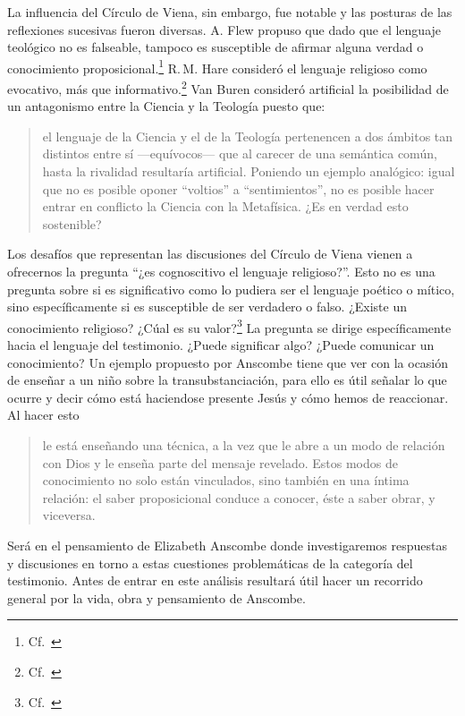 La influencia del Círculo de Viena, sin embargo, fue notable y las posturas de las reflexiones sucesivas fueron diversas. A. Flew propuso que dado que el lenguaje teológico no es falseable, tampoco es susceptible de afirmar alguna verdad o conocimiento proposicional.\footnote{Cf.~\cite[27--30]{conesa1994cc}} R.\,M. Hare consideró el lenguaje religioso como evocativo, más que informativo.\footnote{Cf.~\cite[35--36]{conesa1994cc}} Van Buren consideró artificial la posibilidad de un antagonismo entre la Ciencia y la Teología puesto que: \blockquote[{\cite[156]{dominguez2009at}}]{el lenguaje de la Ciencia y el de la Teología pertenencen a dos ámbitos tan distintos entre sí ---equívocos--- que al carecer de una semántica común, hasta la rivalidad resultaría artificial. Poniendo un ejemplo analógico: igual que no es posible oponer ``voltios'' a ``sentimientos'', no es posible hacer entrar en conflicto la Ciencia con la Metafísica. ¿Es en verdad esto sostenible?}

Los desafíos que representan las discusiones del Círculo de Viena vienen a ofrecernos la pregunta \enquote{¿es cognoscitivo el lenguaje religioso?}. Esto no es una pregunta sobre si es significativo como lo pudiera ser el lenguaje poético o mítico, sino específicamente si es susceptible de ser verdadero o falso. ¿Existe un conocimiento religioso? ¿Cúal es su valor?\footnote{Cf.~\cite[23]{conesa1994cc}} La pregunta se dirige específicamente hacia el lenguaje del testimonio. ¿Puede significar algo? ¿Puede comunicar un conocimiento? Un ejemplo propuesto por Anscombe tiene que ver con la ocasión de enseñar a un niño sobre la transubstanciación, para ello es útil señalar lo que ocurre y decir cómo está haciendose presente Jesús y cómo hemos de reaccionar. Al hacer esto \blockquote[{\cite[21]{conesa1994cc}}]{le está enseñando una técnica, a la vez que le abre a un modo de relación con Dios y le enseña parte del mensaje revelado. Estos modos de conocimiento no solo están vinculados, sino también en una íntima relación: el saber proposicional conduce a conocer, éste a saber obrar, y viceversa.}

  Será en el pensamiento de Elizabeth Anscombe donde investigaremos respuestas y discusiones en torno a estas cuestiones problemáticas de la categoría del testimonio. Antes de entrar en este análisis resultará útil hacer un recorrido general por la vida, obra y pensamiento de Anscombe.
